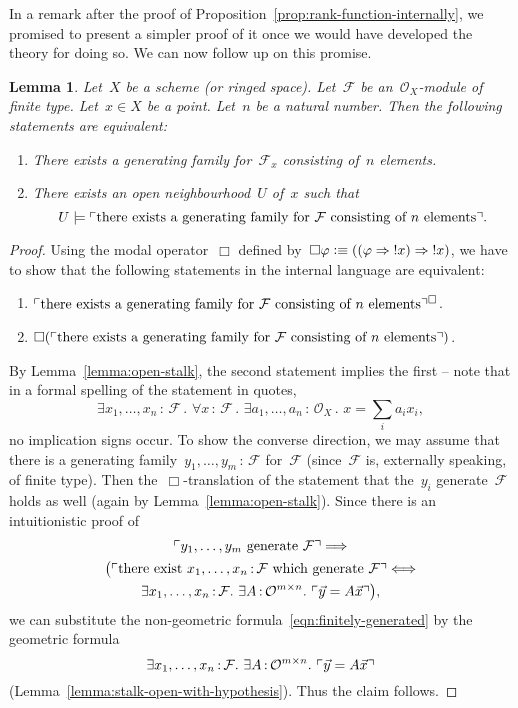 \documentclass[10pt]{amsart}
\theoremstyle{definition}
\theoremstyle{plain}
\newtheorem{lemma}[defn]{Lemma}
\theoremstyle{remark}
\newcommand{\F}{\mathcal{F}}
\renewcommand{\O}{\mathcal{O}}
\newcommand{\?}{\,{:}\,}
\renewcommand{\_}{\mathpunct{.}\,}
\newcommand{\speak}[1]{\ulcorner\text{\textnormal{#1}}\urcorner}
\newcommand{\notat}[1]{{!#1}}
\newcommand{\defequiv}{\vcentcolon\equiv}
\begin{document}
In a remark after the proof of Proposition~\ref{prop:rank-function-internally},
we promised to present a simpler proof of it once we would have developed the theory for
doing so. We can now follow up on this promise.
\begin{lemma}\label{lemma:gen-family-n}
Let~$X$ be a scheme (or ringed space). Let~$\F$ be an~$\O_X$-module
of finite type. Let~$x \in X$ be a point. Let~$n$ be a natural number. Then the
following statements are equivalent:
\begin{enumerate}
\item There exists a generating family for~$\F_x$ consisting of~$n$ elements.
\item There exists an open neighbourhood~$U$ of~$x$ such that
\[ U \models \speak{there exists a generating family for~$\F$ consisting of~$n$
elements}. \]
\end{enumerate}
\end{lemma}
\begin{proof}Using the modal operator~$\Box$ defined by~$\Box\varphi \defequiv
((\varphi \Rightarrow \notat{x}) \Rightarrow \notat{x})$, we have to show that
the following statements in the internal language are equivalent:
\begin{enumerate}
\item $\speak{there exists a generating family
for~$\F$ consisting of~$n$ elements}^\Box$.
\item $\Box(\speak{there exists a generating family
for~$\F$ consisting of~$n$ elements})$.
\end{enumerate}
By Lemma~\ref{lemma:open-stalk}, the second statement implies the first -- note
that in a formal spelling of the statement in quotes,
\begin{equation}\label{eqn:finitely-generated}
  \exists x_1,\ldots,x_n\?\F\_
  \forall x\?\F\_
  \exists a_1,\ldots,a_n\?\O_X\_
  x = \textstyle\sum_i a_i x_i,
\end{equation}
no implication signs occur. To show the converse direction,
we may assume that there is a generating family~$y_1,\ldots,y_m\?\F$ for~$\F$
(since~$\F$ is, externally speaking, of finite type). Then
the~$\Box$-translation of the statement that the~$y_i$ generate~$\F$ holds as
well (again by Lemma~\ref{lemma:open-stalk}). Since there is an intuitionistic
proof of
\begin{multline*}
  \speak{$y_1,\ldots,y_m$ generate~$\F$} \Longrightarrow \\
  \bigl(\speak{there exist $x_1,\ldots,x_n\?\F$ which generate~$\F$}
    \Longleftrightarrow \\
    \exists x_1,\ldots,x_n\?\F\_
    \exists A\?\O^{m \times n}\_ \speak{$\vec y = A \vec x$}\bigr),
\end{multline*}
we can substitute the non-geometric formula~\eqref{eqn:finitely-generated} by the geometric
formula
\[ \exists x_1,\ldots,x_n\?\F\_ \exists A\?\O^{m \times n}\_ \speak{$\vec
y = A \vec x$} \]
(Lemma~\ref{lemma:stalk-open-with-hypothesis}). Thus the claim follows.
\end{proof}
\end{document}
